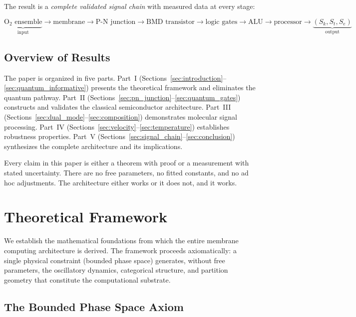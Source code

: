 \documentclass[12pt]{article}
\theoremstyle{definition}
\theoremstyle{remark}
\newcommand{\Sk}{S_k}
\newcommand{\St}{S_t}
\newcommand{\Se}{S_e}
\begin{document}
The result is a \emph{complete validated signal chain} with measured data at every stage:

\begin{equation}
\label{eq:signal_chain}
\underbrace{\text{O}_2 \text{ ensemble}}_{\text{input}} \to \text{membrane} \to \text{P-N junction} \to \text{BMD transistor} \to \text{logic gates} \to \text{ALU} \to \text{processor} \to \underbrace{(\Sk, \St, \Se)}_{\text{output}}
\end{equation}

\subsection{Overview of Results}

The paper is organized in five parts. Part~I (Sections~\ref{sec:introduction}--\ref{sec:quantum_informative}) presents the theoretical framework and eliminates the quantum pathway. Part~II (Sections~\ref{sec:pn_junction}--\ref{sec:quantum_gates}) constructs and validates the classical semiconductor architecture. Part~III (Sections~\ref{sec:dual_mode}--\ref{sec:composition}) demonstrates molecular signal processing. Part~IV (Sections~\ref{sec:velocity}--\ref{sec:temperature}) establishes robustness properties. Part~V (Sections~\ref{sec:signal_chain}--\ref{sec:conclusion}) synthesizes the complete architecture and its implications.

Every claim in this paper is either a theorem with proof or a measurement with stated uncertainty. There are no free parameters, no fitted constants, and no ad hoc adjustments. The architecture either works or it does not, and it works.


\section{Theoretical Framework}
\label{sec:theory}

We establish the mathematical foundations from which the entire membrane computing architecture is derived. The framework proceeds axiomatically: a single physical constraint (bounded phase space) generates, without free parameters, the oscillatory dynamics, categorical structure, and partition geometry that constitute the computational substrate.

\subsection{The Bounded Phase Space Axiom}
\end{document}
